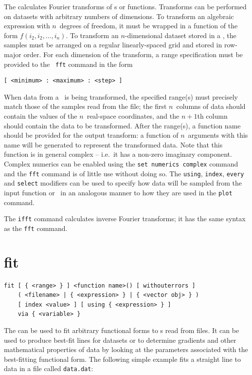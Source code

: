 The  calculates Fourier transforms of \datafile s or functions.
Transforms can be performed on datasets with arbitrary numbers of dimensions.
To transform an algebraic expression with $n$~degrees of freedom, it must be
wrapped in a function of the form $f(i_2,i_2,\ldots,i_n)$. To transform an
$n$-dimensional dataset stored in a \datafile, the samples must be arranged on
a regular linearly-spaced grid and stored in row-major order.  For each
dimension of the transform, a range specification must be provided to the {\tt
fft} command in the form

\begin{verbatim}
[ <minimum> : <maximum> : <step> ]
\end{verbatim}

When data from a \datafile\ is being transformed, the specified range(s) must
precisely match those of the samples read from the file; the first $n$~columns
of data should contain the values of the $n$~real-space coordinates, and the
$n+1$th column should contain the data to be transformed.  After the range(s),
a function name should be provided for the output transform: a function of
$n$~arguments with this name will be generated to represent the transformed
data.  Note that this function is in general complex -- i.e.\ it has a non-zero
imaginary component. Complex numerics can be enabled using the {\tt set
numerics complex} command and the {\tt fft} command is of little use without
doing so. The {\tt using}, {\tt index}, {\tt every} and {\tt select} modifiers
can be used to specify how data will be sampled from the input function or
\datafile\ in an analogous manner to how they are used in the {\tt plot}
command.

The {\tt ifft} command calculates inverse Fourier transforms; it has the same
syntax as the {\tt fft} command.


\section{fit}

\begin{verbatim}
fit [ { <range> } ] <function name>() [ withouterrors ]
    ( <filename> | { <expression> } | { <vector obj> } )
    [ index <value> ] [ using { <expression> } ]
    via { <variable> }
\end{verbatim}

The  can be used to fit arbitrary functional forms to \datapoint s
read from files. It can be used to produce best-fit lines for datasets or to
determine gradients and other mathematical properties of data by looking at the
parameters associated with the best-fitting functional form.  The following
simple example fits a straight line to data in a file called {\tt data.dat}:


